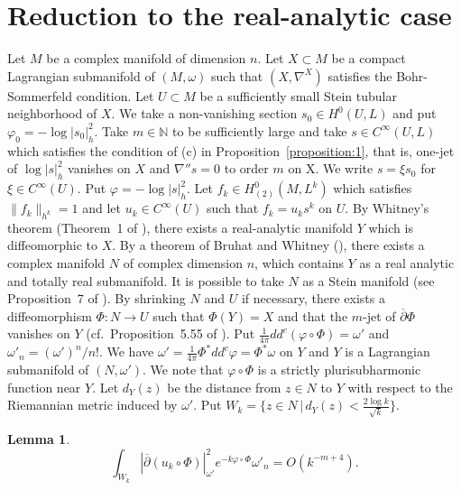 \documentclass[12pt,oneside]{amsart}
\theoremstyle{plain}
\newtheorem{lemma}{Lemma}
\theoremstyle{definition}
\theoremstyle{remark}
\begin{document}
\section{Reduction to the real-analytic case}\label{section:4}
Let $M$ be a complex manifold of dimension $n$.  
Let $X \subset M$ be a compact Lagrangian submanifold of $(M, \omega)$ such that $(X, \nabla^{X})$ satisfies the Bohr-Sommerfeld condition.  
Let $U \subset M$ be a sufficiently small Stein tubular neighborhood of $X$.  
We take a non-vanishing section $s_{0} \in H^{0}(U, L)$ and put $\varphi_{0} = -\log |s_{0}|^2_{h}$.  
Take $m \in \mathbb{N}$ to be sufficiently large 
and take $s \in C^{\infty}(U, L)$ which satisfies the condition of (c) in Proposition~\ref{proposition:1}, that is, one-jet of $\log |s|_{h}^2$ vanishes on $X$ and $\nabla'' s = 0$ to order $m$ on X.  
We write $s = \xi s_{0}$ for $\xi \in C^{\infty}(U)$.  
Put $\varphi = -\log |s|_{h}^2$.  
Let $f_{k} \in H^{0}_{(2)}(M, L^k)$ which satisfies $\|f_{k}\|_{h^k} = 1$ and let $u_{k} \in C^{\infty}(U)$ such that $f_{k} = u_{k}s^k$ on $U$.  
By Whitney's theorem (Theorem~1 of \cite{Whi2}), there exists a real-analytic manifold $Y$ which is diffeomorphic to  $X$. 
By a theorem of Bruhat and Whitney (\cite{Whi-Bru}), there exists a complex manifold $N$ of complex dimension $n$, which contains $Y$ as a real analytic and totally real submanifold.  
It is possible to take $N$ as a Stein manifold (see Proposition~7 of \cite{Gra}).  
By shrinking $N$ and $U$ if necessary, 
there exists a diffeomorphism $\Phi: N \to U$ such that $\Phi(Y) = X$ and that the $m$-jet of $\overline{\partial}\Phi$ vanishes on $Y$ (cf.~Proposition~5.55 of \cite{Cie-Eli}).  
Put $\frac{1}{4\pi}dd^c (\varphi \circ \Phi) = \omega'$ and $\omega'_{n} = (\omega')^n/n!$. 
We have $\omega' = \frac{1}{4\pi}\Phi^{*} dd^c \varphi = \Phi^{*}\omega$ on $Y$ 
and $Y$ is a Lagrangian submanifold of $(N, \omega')$.   
We note that $\varphi \circ \Phi$ is a strictly plurisubharmonic function near $Y$.  
Let $d_{Y}(z)$ be the distance from $z \in N$ to $Y$ with respect to the Riemannian metric induced by $\omega'$.   
Put $W_{k} = \{z \in N\, |\, d_{Y}(z) < \frac{2\log k}{\sqrt{k}}\}$.  
\begin{lemma}\label{lemma:4}
\[
\int_{W_{k}} |\overline{\partial}(u_{k}\circ\Phi)|^2_{\omega'} e^{-k\varphi \circ \Phi}\omega'_{n} = O(k^{-m+4}).  
\]
\end{lemma}
\end{document}
